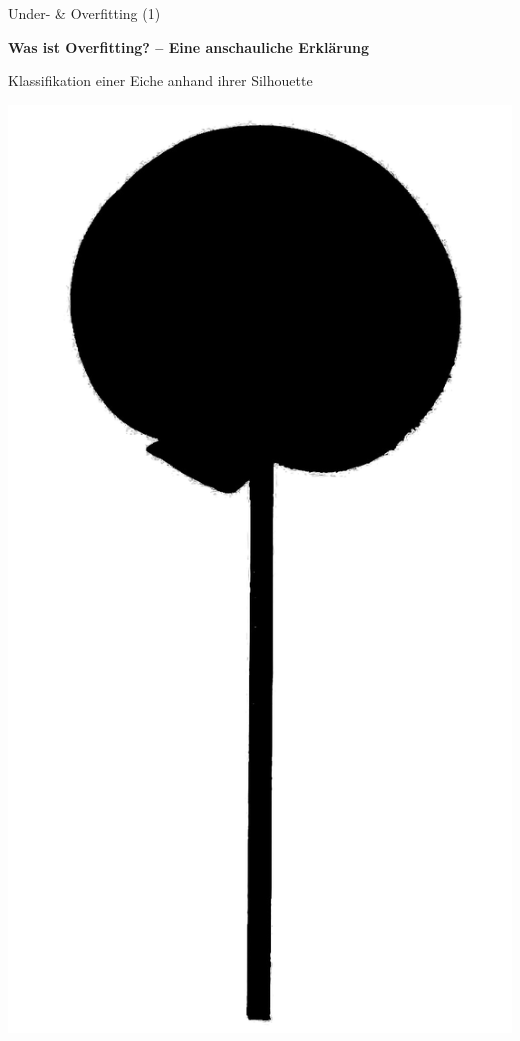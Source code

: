 \begin{frame}{Under- \& Overfitting (1)}

\textbf{Was ist Overfitting? -- Eine anschauliche Erklärung}

Klassifikation einer Eiche anhand ihrer Silhouette

\begin{center}
\includegraphics[height=0.9\textheight]{src/lollischwarz} \pause

\end{center}
\end{frame}
